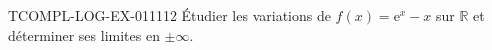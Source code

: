 \begin{exercice}{TCOMPL-LOG-EX-011}{1}{12}
Étudier les variations de $f(x) = \mathrm{e}^x - x$ sur $\mathbb{R}$ et déterminer ses limites en $\pm\infty$.

\end{exercice}
